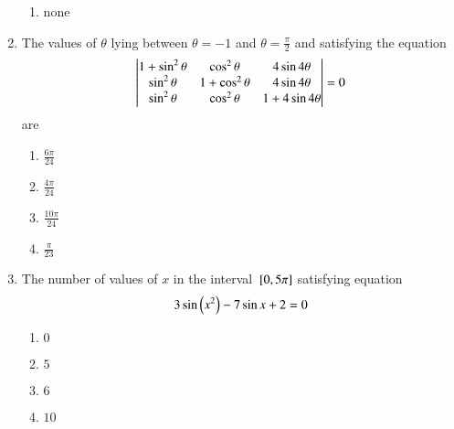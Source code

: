 \begin{enumerate}[label=\thesubsection.\arabic*,ref=\thesubsection.\theenumi]
\begin{multicols}{5}
\begin{enumerate}
\item none
\end{enumerate}
\end{multicols}
\item The values of $\theta$ lying between $\theta = -1$ and $\theta = \frac{\pi}{2}$ and satisfying the equation
	\begin{align*}
	\begin{vmatrix}
1+\sin^2\theta & \cos^2\theta & 4\sin4\theta
\\
\sin^2\theta & 1+\cos^2\theta & 4\sin4\theta
\\
\sin^2\theta & \cos^2\theta & 1+4\sin4\theta
\end{vmatrix}=0
	\end{align*}
are
\hfill{}
\begin{multicols}{4}
\begin{enumerate}
\item $\frac{6\pi}{24}$
\item $\frac{4\pi}{24}$
\item $\frac{10\pi}{24}$
\item $\frac{\pi}{23}$
\end{enumerate}
\end{multicols}
\item The number of values of $x$ in the interval ${}\left[0,5\pi\right]$ satisfying equation 
$$3 \sin{\ensuremath{\left(x^2\right)}}-7 \sin{x+2}=0$$  \hfill{} 
\begin{multicols}{4}
\begin{enumerate}
    \item $0$
    \item $5$
    \item $6$
    \item $10$
\end{enumerate}
\end{multicols}


\end{enumerate}

